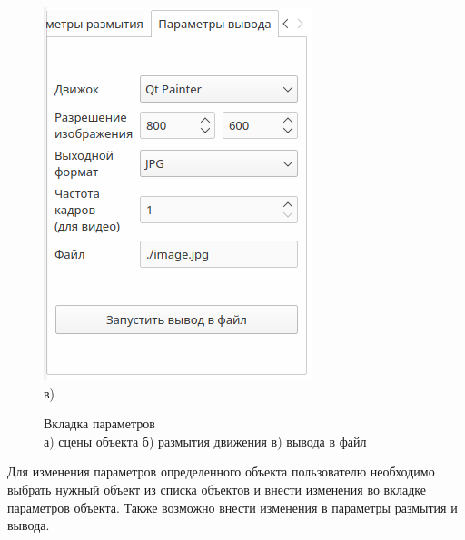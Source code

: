 \begin{figure}[h]
\begin{minipage}[h]{0.32\linewidth}
{            \includegraphics[width=\linewidth]{img/gui/tab3.png} \\ в)
            }
    \end{minipage}
    \caption{Вкладка параметров \\
    а) сцены объекта 
    б) размытия движения
    в) вывода в файл}
    \label{fig:gui_tabs}
\end{figure}

Для изменения параметров определенного объекта пользователю необходимо выбрать нужный объект из списка объектов и внести изменения во вкладке параметров объекта. Также возможно внести изменения в параметры размытия и вывода. 

